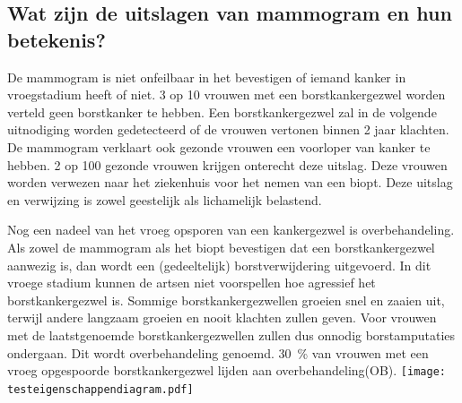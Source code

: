 \documentclass[a4paper,notumble]{leaflet}
\begin{document}
\subsection{Wat zijn de uitslagen van mammogram en hun betekenis?}
De mammogram is niet onfeilbaar in het bevestigen of iemand kanker in vroegstadium heeft of niet. 3 op 10 vrouwen met een borstkankergezwel worden verteld geen borstkanker te hebben. Een borstkankergezwel zal in de volgende uitnodiging worden gedetecteerd of de vrouwen vertonen binnen 2 jaar klachten. De mammogram verklaart ook gezonde vrouwen een voorloper van kanker te hebben. 2 op 100 gezonde vrouwen krijgen onterecht deze uitslag. Deze vrouwen worden verwezen naar het ziekenhuis voor het nemen van een biopt. Deze uitslag en verwijzing is zowel geestelijk als lichamelijk belastend.\par
Nog een nadeel van het vroeg opsporen van een kankergezwel is overbehandeling. Als zowel de mammogram als het biopt bevestigen dat een borstkankergezwel aanwezig is, dan wordt een (gedeeltelijk) borstverwijdering uitgevoerd. In dit vroege stadium kunnen de artsen niet voorspellen hoe agressief het borstkankergezwel is. Sommige borstkankergezwellen groeien snel en zaaien uit, terwijl andere langzaam groeien en nooit klachten zullen geven. Voor vrouwen met de laatstgenoemde borstkankergezwellen zullen dus onnodig borstamputaties ondergaan. Dit wordt overbehandeling genoemd. 30~\% van vrouwen met een vroeg opgespoorde borstkankergezwel lijden aan overbehandeling(OB).
\newpage
\texttt{[image: testeigenschappendiagram.pdf]}
\newpage
\end{document}
